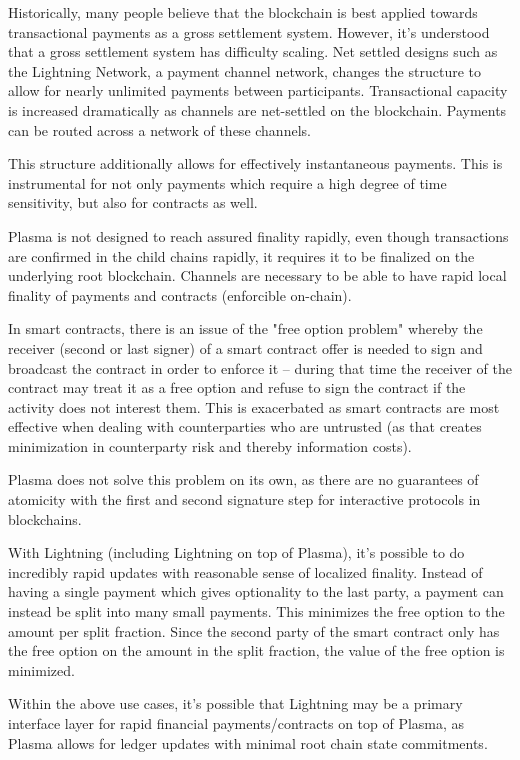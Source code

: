 \documentclass[letterpaper, 11pt]{article}
\begin{document}
Historically, many people believe that the blockchain is best applied towards
transactional payments as a gross settlement system. However, it's understood
that a gross settlement system has difficulty scaling. Net settled designs such
as the Lightning Network, a payment channel network, changes the structure to
allow for nearly unlimited payments between participants. Transactional capacity
is increased dramatically as channels are net-settled on the blockchain.
Payments can be routed across a network of these channels.

This structure additionally allows for effectively instantaneous payments. This
is instrumental for not only payments which require a high degree of time
sensitivity, but also for contracts as well.

Plasma is not designed to reach assured finality rapidly, even though
transactions are confirmed in the child chains rapidly, it requires it to be
finalized on the underlying root blockchain. Channels are necessary to be able
to have rapid local finality of payments and contracts (enforcible on-chain).

In smart contracts, there is an issue of the "free option problem" whereby the
receiver (second or last signer) of a smart contract offer is needed to sign and
broadcast the contract in order to enforce it -- during that time the receiver
of the contract may treat it as a free option and refuse to sign the contract if
the activity does not interest them. This is exacerbated as smart contracts are
most effective when dealing with counterparties who are untrusted (as that
creates minimization in counterparty risk and thereby information costs).

Plasma does not solve this problem on its own, as there are no guarantees of
atomicity with the first and second signature step for interactive protocols in
blockchains.

With Lightning (including Lightning on top of Plasma), it's possible to do
incredibly rapid updates with reasonable sense of localized finality. Instead
of having a single payment which gives optionality to the last party, a payment
can instead be split into many small payments. This minimizes the free option
to the amount per split fraction. Since the second party of the smart contract
only has the free option on the amount in the split fraction, the value of the
free option is minimized.

Within the above use cases, it's possible that Lightning may be a primary
interface layer for rapid financial payments/contracts on top of Plasma, as
Plasma allows for ledger updates with minimal root chain state commitments.
\end{document}
